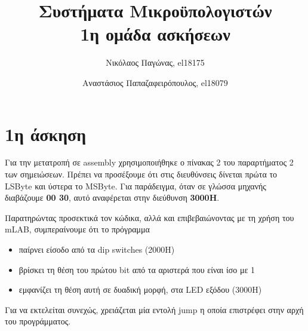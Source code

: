 \documentclass[a4paper]{article}
\title{Συστήματα Μικροϋπολογιστών \\ 1η ομάδα ασκήσεων}
\author{Νικόλαος Παγώνας, el18175 \and Αναστάσιος Παπαζαφειρόπουλος, el18079}
\date{}
\begin{document}
\maketitle

\section*{1η άσκηση}

Για την μετατροπή σε assembly χρησιμοποιήθηκε ο πίνακας 2 του παραρτήματος 2 των σημειώσεων. Πρέπει να προσέξουμε ότι στις διευθύνσεις δίνεται πρώτα το LSByte και ύστερα το MSByte. Για παράδειγμα, όταν σε γλώσσα μηχανής διαβάζουμε \textbf{00 30}, αυτό αναφέρεται στην διεύθυνση \textbf{3000Η}. 




Παρατηρώντας προσεκτικά τον κώδικα, αλλά και επιβεβαιώνοντας με τη χρήση του mLAB, συμπεραίνουμε ότι το πρόγραμμα 

\begin{itemize}

	\item παίρνει είσοδο από τα dip switches (2000Η)
	\item βρίσκει τη θέση του πρώτου bit από τα αριστερά που είναι ίσο με 1 
	\item εμφανίζει τη θέση αυτή σε δυαδική μορφή, στα LED εξόδου (3000Η) 
\end{itemize}

Για να εκτελείται συνεχώς, χρειάζεται μία εντολή jump η οποία επιστρέφει στην αρχή του προγράμματος.
\end{document}
